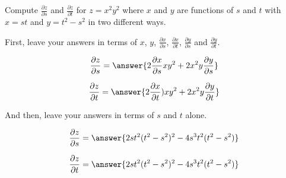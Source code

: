 \documentclass{ximera}
\author{David Guichard \and Neal Koblitz \and H. Jerome Keisler \and Albert Scheller \and Barry Balof \and Mike Wills \and Matthew Carr}
\begin{document}
\begin{exercise}




Compute $\frac{\partial z}{\partial s}$ and $\frac{\partial z}{\partial t}$ for $z=x^2 y^2$ where $x$ and $y$ are functions of $s$ and $t$ with $x=st$ and $y=t^2-s^2$ in two different ways.

First, leave your answers in terms of $x$, $y$, $\frac{\partial x}{\partial s}$, $\frac{\partial x}{\partial t}$, $\frac{\partial y}{\partial s}$ and $\frac{\partial y}{\partial t}$.

\begin{prompt}
\[
\frac{\partial z}{\partial s}=\answer{2\frac{\partial x}{\partial s}xy^2+2x^2y\frac{\partial y}{\partial s}}
\]
\end{prompt}

\begin{prompt}
\[
\frac{\partial z}{\partial t}=\answer{2 \frac{\partial x}{\partial t})xy^2+2 x^2 y\frac{\partial y}{\partial t}}
\]
\end{prompt}


And then, leave your answers in terms of $s$ and $t$ alone.

\begin{prompt}
\[
\frac{\partial z}{\partial s}=\answer{2st^2(t^2-s^2)^2-4s^3t^2(t^2-s^2)}
\]
\end{prompt}

\begin{prompt}
\[
\frac{\partial z}{\partial t}=\answer{2 s t^2(t^2-s^2)^2-4 s^3 t^2(t^2-s^2)}
\]
\end{prompt}


\end{exercise}
\end{document}
